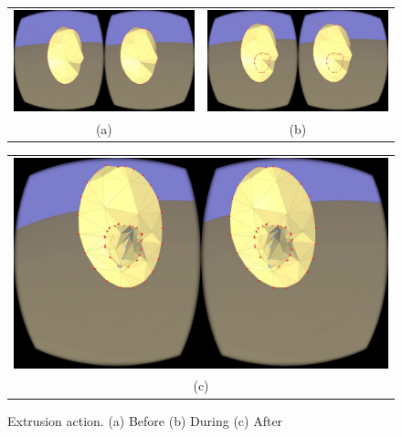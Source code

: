 \begin{figure}[!h]
    \centering
    \setlength{\tabcolsep}{0.0130\linewidth}
    \begin{tabular}{@{}cc@{}}
    \includegraphics[width=0.45\linewidth]{figures/pre_extrude} &
       	\includegraphics[width=0.45\linewidth]{figures/during_extrude2} \\
       	(a)&(b)\\
       	\end{tabular}
       	
       	  \centering
    \setlength{\tabcolsep}{0.0130\linewidth}
    \begin{tabular}{@{}c@{}}
    \includegraphics[width=0.926\linewidth]{figures/post_extrude}\\
    (c)
    \end{tabular}
    \caption[Extrusion action]{Extrusion action.
    	  \textup{(a)} Before \textup{(b)} During \textup{(c)} After
      \label{fig:extrude_example}}
\end{figure}

